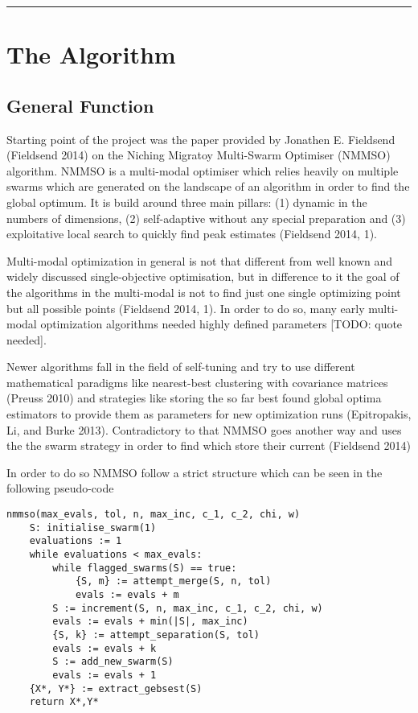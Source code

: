 \documentclass[12pt,a4paper]{article}
\begin{document}
\begin{center}\rule{0.5\linewidth}{\linethickness}\end{center}

\section{The Algorithm}\label{the-algorithm}

\subsection{General Function}\label{general-function}

Starting point of the project was the paper provided by Jonathen E.
Fieldsend (Fieldsend 2014) on the Niching Migratoy Multi-Swarm Optimiser
(NMMSO) algorithm. NMMSO is a multi-modal optimiser which relies heavily
on multiple swarms which are generated on the landscape of an algorithm
in order to find the global optimum. It is build around three main
pillars: (1) dynamic in the numbers of dimensions, (2) self-adaptive
without any special preparation and (3) exploitative local search to
quickly find peak estimates (Fieldsend 2014, 1).

Multi-modal optimization in general is not that different from well
known and widely discussed single-objective optimisation, but in
difference to it the goal of the algorithms in the multi-modal is not to
find just one single optimizing point but all possible points (Fieldsend
2014, 1). In order to do so, many early multi-modal optimization
algorithms needed highly defined parameters {[}TODO: quote needed{]}.

Newer algorithms fall in the field of self-tuning and try to use
different mathematical paradigms like nearest-best clustering with
covariance matrices (Preuss 2010) and strategies like storing the so far
best found global optima estimators to provide them as parameters for
new optimization runs (Epitropakis, Li, and Burke 2013). Contradictory
to that NMMSO goes another way and uses the the swarm strategy in order
to find which store their current (Fieldsend 2014)

In order to do so NMMSO follow a strict structure which can be seen in
the following pseudo-code

\begin{verbatim}
nmmso(max_evals, tol, n, max_inc, c_1, c_2, chi, w)
    S: initialise_swarm(1)
    evaluations := 1
    while evaluations < max_evals:
        while flagged_swarms(S) == true:
            {S, m} := attempt_merge(S, n, tol)
            evals := evals + m
        S := increment(S, n, max_inc, c_1, c_2, chi, w)
        evals := evals + min(|S|, max_inc)
        {S, k} := attempt_separation(S, tol)
        evals := evals + k
        S := add_new_swarm(S)
        evals := evals + 1
    {X*, Y*} := extract_gebsest(S)
    return X*,Y*
\end{verbatim}
\end{document}

